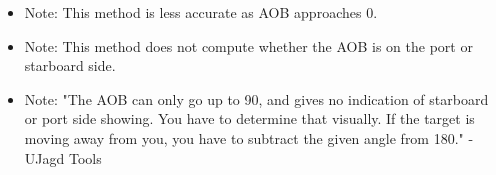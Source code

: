 \documentclass{article}
\begin{document}
\begin{itemize}
\item{Note: This method is less accurate as AOB approaches 0.}
\item{Note: This method does not compute whether the AOB is on the port or starboard side.}
\item{Note: "The AOB can only go up to 90, and gives no indication of starboard or port side showing. You have to determine that visually. If the target is moving away from you, you have to subtract the given angle from 180." -UJagd Tools}
\end{itemize}
\end{document}
